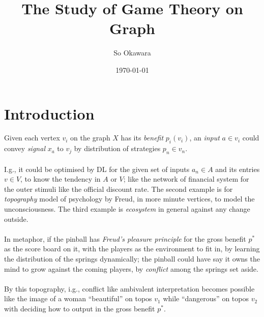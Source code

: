 \documentclass[a4paper, 10pt]{article}
\author{So Okawara}
\date{\today}
\title{The Study of Game Theory on Graph}
\begin{document}
\maketitle
\section{Introduction}
Given each vertex $v_i$ on the graph $X$ has its \emph{benefit} $p_i(v_i)$, an \emph{input} $a \in v_i$ could convey \emph{signal} $x_a$ to $v_j$ by distribution of strategies $ p_n \in v_n$.\\\\
I.g., it could be optimised by DL for the given set of inputs $a_n \in A$ and its entries $v \in V$, to know the tendency in $A$ or $V$; like the network of financial system for the outer stimuli like the official discount rate. The second example is for \emph{topography} model of psychology by Freud, in more minute vertices, to model the unconsciousness. The third example is \emph{ecosystem} in general against any change outside.\\\\
In metaphor, if the pinball has \emph{Freud's pleasure principle} for the gross benefit $p^*$ as the score board on it, with the players as the environment to fit in, by learning the distribution of the springs dynamically; the pinball could have say it owns the mind to grow against the coming players, by \emph{conflict} among the springs set aside.\\\\
By this topography, i.g., conflict like ambivalent interpretation becomes possible like the image of a woman ``beautiful'' on topos $v_1$ while ``dangerous'' on topos $v_2$ with deciding how to output in the gross benefit $p^*$.
\end{document}
